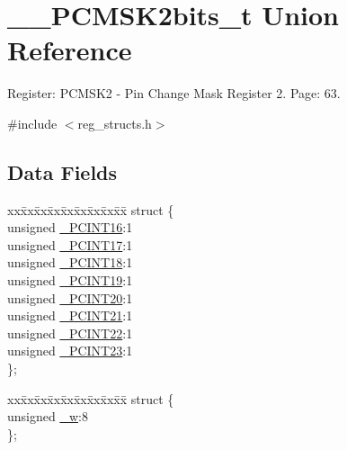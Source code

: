 \hypertarget{union_____p_c_m_s_k2bits__t}{\section{\+\_\+\+\_\+\+P\+C\+M\+S\+K2bits\+\_\+t Union Reference}
\label{union_____p_c_m_s_k2bits__t}
}


Register\+: P\+C\+M\+S\+K2 -\/ Pin Change Mask Register 2. Page\+: 63.  




{\ttfamily \#include $<$reg\+\_\+structs.\+h$>$}

\subsection*{Data Fields}
\begin{DoxyCompactItemize}
\item 
\begin{tabbing}
xx\=xx\=xx\=xx\=xx\=xx\=xx\=xx\=xx\=\kill
struct \{\\
\>unsigned \hyperlink{union_____p_c_m_s_k2bits__t_ae23198008dc481599ceb3073588f87b7}{\_PCINT16}:1\\
\>unsigned \hyperlink{union_____p_c_m_s_k2bits__t_ab2ef255881ab41b23a900563cb206628}{\_PCINT17}:1\\
\>unsigned \hyperlink{union_____p_c_m_s_k2bits__t_a96ef0e09870b853c278d59c4baac4774}{\_PCINT18}:1\\
\>unsigned \hyperlink{union_____p_c_m_s_k2bits__t_a5ae73bbbbe60bb23a6ebb363275b4dca}{\_PCINT19}:1\\
\>unsigned \hyperlink{union_____p_c_m_s_k2bits__t_a0be135408a50f85dfbd752bc2706d875}{\_PCINT20}:1\\
\>unsigned \hyperlink{union_____p_c_m_s_k2bits__t_a1a9b6f182ea818f2885a3f2837c8747a}{\_PCINT21}:1\\
\>unsigned \hyperlink{union_____p_c_m_s_k2bits__t_ae253cf79ac718fabffaeb578522dc83c}{\_PCINT22}:1\\
\>unsigned \hyperlink{union_____p_c_m_s_k2bits__t_a6d866e16300c70f880317d5aea287ac1}{\_PCINT23}:1\\
\}; \\

\end{tabbing}\item 
\begin{tabbing}
xx\=xx\=xx\=xx\=xx\=xx\=xx\=xx\=xx\=\kill
struct \{\\
\>unsigned \hyperlink{union_____p_c_m_s_k2bits__t_a1b7fc3ec4cf59e51917cf7dacc3833a5}{\_w}:8\\
\}; \\

\end{tabbing}\end{DoxyCompactItemize}


